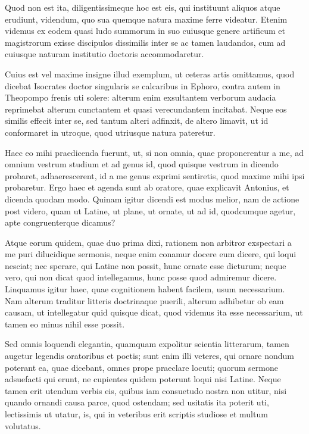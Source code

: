  Quod non est ita, diligentissimeque hoc est eis, qui instituunt aliquos atque erudiunt, videndum, quo sua quemque natura maxime ferre videatur. Etenim videmus ex eodem quasi ludo summorum in suo cuiusque genere artificum et magistrorum exisse discipulos dissimilis inter se ac tamen laudandos, cum ad cuiusque naturam institutio doctoris accommodaretur.

 Cuius est vel maxime insigne illud exemplum, ut ceteras artis omittamus, quod dicebat Isocrates doctor singularis se calcaribus in Ephoro, contra autem in Theopompo frenis uti solere: alterum enim exsultantem verborum audacia reprimebat alterum cunctantem et quasi verecundantem incitabat. Neque eos similis effecit inter se, sed tantum alteri adfinxit, de altero limavit, ut id conformaret in utroque, quod utriusque natura pateretur.

 Haec eo mihi praedicenda fuerunt, ut, si non omnia, quae proponerentur a me, ad omnium vestrum studium et ad genus id, quod quisque vestrum in dicendo probaret, adhaerescerent, id a me genus exprimi sentiretis, quod maxime mihi ipsi probaretur. Ergo haec et agenda sunt ab oratore, quae explicavit Antonius, et dicenda quodam modo. Quinam igitur dicendi est modus melior, nam de actione post videro, quam ut Latine, ut plane, ut ornate, ut ad id, quodcumque agetur, apte congruenterque dicamus?

 Atque eorum quidem, quae duo prima dixi, rationem non arbitror exspectari a me puri dilucidique sermonis, neque enim conamur docere eum dicere, qui loqui nesciat; nec sperare, qui Latine non possit, hunc ornate esse dicturum; neque vero, qui non dicat quod intellegamus, hunc posse quod admiremur dicere. Linquamus igitur haec, quae cognitionem habent facilem, usum necessarium. Nam alterum traditur litteris doctrinaque puerili, alterum adhibetur ob eam causam, ut intellegatur quid quisque dicat, quod videmus ita esse necessarium, ut tamen eo minus nihil esse possit.

 Sed omnis loquendi elegantia, quamquam expolitur scientia litterarum, tamen augetur legendis oratoribus et poetis; sunt enim illi veteres, qui ornare nondum poterant ea, quae dicebant, omnes prope praeclare locuti; quorum sermone adsuefacti qui erunt, ne cupientes quidem poterunt loqui nisi Latine. Neque tamen erit utendum verbis eis, quibus iam consuetudo nostra non utitur, nisi quando ornandi causa parce, quod ostendam; sed usitatis ita poterit uti, lectissimis ut utatur, is, qui in veteribus erit scriptis studiose et multum volutatus.

